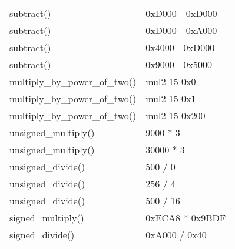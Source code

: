 \begin{tabular}[h]{ll}
subtract()                      &  0xD000 - 0xD000                      \\
subtract()                      &  0xD000 - 0xA000                      \\
subtract()                      &  0x4000 - 0xD000                      \\
subtract()                      &  0x9000 - 0x5000                      \\
multiply\_by\_power\_of\_two()  &  mul2 15 0x0                          \\
multiply\_by\_power\_of\_two()  &  mul2 15 0x1                          \\
multiply\_by\_power\_of\_two()  &  mul2 15 0x200                        \\
unsigned\_multiply()            &  9000 * 3                             \\
unsigned\_multiply()            &  30000 * 3                            \\
unsigned\_divide()              &  500 / 0                              \\
unsigned\_divide()              &  256 / 4                              \\
unsigned\_divide()              &  500 / 16                             \\
signed\_multiply()              &  0xECA8 * 0x9BDF                      \\
signed\_divide()                &  0xA000 / 0x40                        \\

\end{tabular}
